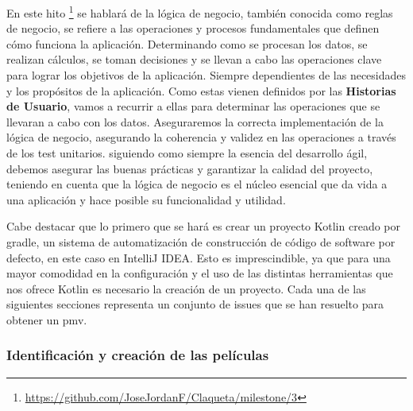 En este hito \footnote{\url{https://github.com/JoseJordanF/Claqueta/milestone/3}} se hablará de la 
lógica de negocio, también conocida como reglas de negocio, se refiere a las operaciones y procesos 
fundamentales que definen cómo funciona la aplicación. Determinando como se procesan los datos, se 
realizan cálculos, se toman decisiones y se llevan a cabo las operaciones clave para lograr los 
objetivos de la aplicación. Siempre dependientes de las necesidades y los propósitos de la aplicación. 
Como estas vienen definidos por las \textbf{Historias de Usuario}, vamos a recurrir a ellas para 
determinar las operaciones que se llevaran a cabo con los datos. Aseguraremos la correcta 
implementación de la lógica de negocio, asegurando la coherencia y validez en las operaciones a través 
de los test unitarios. siguiendo como siempre la esencia del desarrollo ágil, debemos asegurar las
buenas prácticas y garantizar la calidad del proyecto, teniendo en cuenta que la lógica de negocio es 
el núcleo esencial que da vida a una aplicación y hace posible su funcionalidad y utilidad. 

Cabe destacar que lo primero que se hará es crear un proyecto Kotlin creado por gradle, un sistema de 
automatización de construcción de código de software por defecto, en este caso en IntelliJ IDEA. Esto 
es imprescindible, ya que para una mayor comodidad en la configuración y el uso de las distintas 
herramientas que nos ofrece Kotlin es necesario la creación de un proyecto.
Cada una de las siguientes secciones representa un conjunto de issues que se han resuelto para obtener 
un pmv.

\subsubsection{Identificación y creación de las películas}

